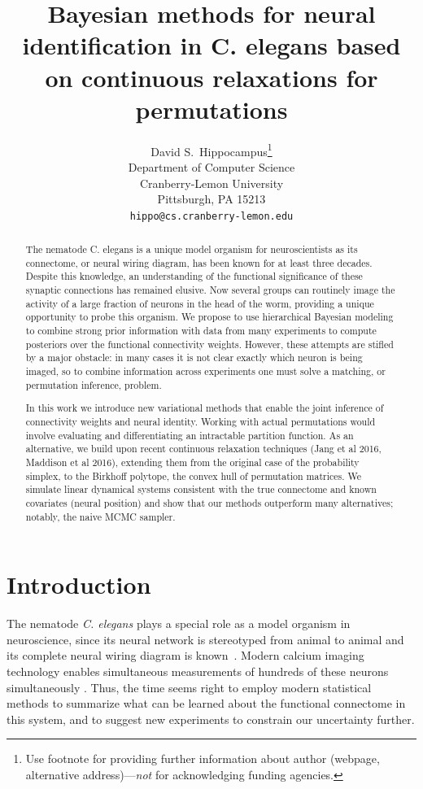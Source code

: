 \documentclass{article}
\title{Bayesian methods for neural identification in C. elegans based on continuous relaxations for permutations}
\author{
  David S.~Hippocampus\thanks{Use footnote for providing further
    information about author (webpage, alternative
    address)---\emph{not} for acknowledging funding agencies.} \\
  Department of Computer Science\\
  Cranberry-Lemon University\\
  Pittsburgh, PA 15213 \\
  \texttt{hippo@cs.cranberry-lemon.edu} \\
}
\begin{document}

\maketitle

\begin{abstract}
  The nematode C. elegans is a unique model organism for neuroscientists  as its connectome, or neural wiring diagram, has been known for at least three decades. Despite this knowledge, an understanding of the functional significance of these synaptic connections has remained elusive. Now several groups can routinely  image the activity of a large fraction of neurons in the head of the worm, providing a unique opportunity to probe this organism. We propose to use hierarchical Bayesian modeling to combine strong prior information with data from many experiments to compute posteriors over the functional connectivity weights. However, these attempts are stifled by a major obstacle: in many cases it is not clear exactly which neuron is being imaged, so to combine information across experiments one must solve a matching, or permutation inference, problem.

In this work we introduce new variational methods that enable the joint inference of connectivity weights and neural identity. Working with actual permutations would involve evaluating and differentiating an intractable partition function. As an alternative, we build upon recent continuous relaxation techniques (Jang et al 2016, Maddison et al 2016), extending them from the original case of the probability simplex, to the Birkhoff polytope, the convex hull of permutation matrices. We simulate linear dynamical systems consistent with the true connectome and known covariates (neural position) and show that our methods outperform many alternatives; notably, the naive MCMC sampler.
\end{abstract}



\section{Introduction}
The nematode \textit{C. elegans} plays a special role as a model organism
in neuroscience, since its neural network is stereotyped from animal to
animal and its complete neural wiring diagram is
known~\citep{varshney2011structural}.  
Modern calcium imaging technology enables simultaneous measurements of
hundreds of these neurons simultaneously \citep{Kato2015,
  nguyen2016whole}. Thus, the time seems right to employ modern statistical methods to summarize what can
be learned about the functional connectome in this system, and to suggest new experiments to constrain our uncertainty further.  
  
\end{document}
